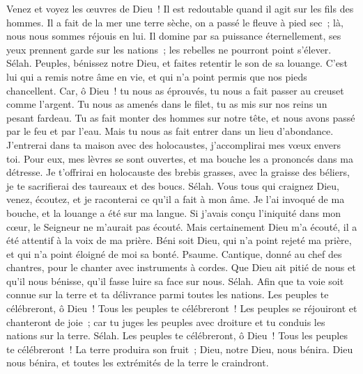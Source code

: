 \begin{multicols}{2}
Venez et voyez les œuvres de Dieu~! Il est redoutable quand il agit sur les fils des hommes.
Il a fait de la mer une terre sèche, on a passé le fleuve à pied sec~; là, nous nous sommes réjouis en lui.
Il domine par sa puissance éternellement, ses yeux prennent garde sur les nations~; les rebelles ne pourront point s'élever. Sélah.
Peuples, bénissez notre Dieu, et faites retentir le son de sa louange.
C'est lui qui a remis notre âme en vie, et qui n'a point permis que nos pieds chancellent.
Car, ô Dieu~! tu nous as éprouvés, tu nous a fait passer au creuset comme l'argent.
Tu nous as amenés dans le filet, tu as mis sur nos reins un pesant fardeau.
Tu as fait monter des hommes sur notre tête, et nous avons passé par le feu et par l'eau. Mais tu nous as fait entrer dans un lieu d'abondance.
J'entrerai dans ta maison avec des holocaustes, j'accomplirai mes vœux envers toi.
Pour eux, mes lèvres se sont ouvertes, et ma bouche les a prononcés dans ma détresse.
Je t'offrirai en holocauste des brebis grasses, avec la graisse des béliers, je te sacrifierai des taureaux et des boucs. Sélah.
Vous tous qui craignez Dieu, venez, écoutez, et je raconterai ce qu'il a fait à mon âme.
Je l'ai invoqué de ma bouche, et la louange a été sur ma langue.
Si j'avais conçu l'iniquité dans mon cœur, le Seigneur ne m'aurait pas écouté.
Mais certainement Dieu m'a écouté, il a été attentif à la voix de ma prière.
Béni soit Dieu, qui n'a point rejeté ma prière, et qui n'a point éloigné de moi sa bonté.
\VerseOne{}Psaume. Cantique, donné au chef des chantres, pour le chanter avec instruments à cordes.
Que Dieu ait pitié de nous et qu'il nous bénisse, qu'il fasse luire sa face sur nous. Sélah.
Afin que ta voie soit connue sur la terre et ta délivrance parmi toutes les nations.
Les peuples te célébreront, ô Dieu~! Tous les peuples te célébreront~!
Les peuples se réjouiront et chanteront de joie~; car tu juges les peuples avec droiture et tu conduis les nations sur la terre. Sélah.
Les peuples te célébreront, ô Dieu~! Tous les peuples te célébreront~!
La terre produira son fruit~; Dieu, notre Dieu, nous bénira.
Dieu nous bénira, et toutes les extrémités de la terre le craindront.

\end{multicols}
